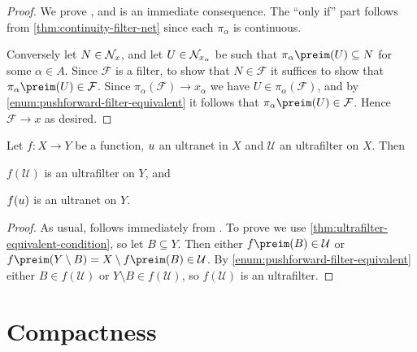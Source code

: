 \documentclass[article, a4paper, 11pt, oneside]{memoir}
\numberwithin{equation}{chapter}
\newcommand{\calU}{\mathcal{U}}
\newcommand{\calF}{\mathcal{F}}
\theoremstyle{nonumberplain}
\begin{document}
\begin{proof}
    We prove , and  is an immediate consequence. The \enquote{only if} part follows from \cref{thm:continuity-filter-net} since each $\pi_\alpha$ is continuous.
    
    Conversely let $N \in \mathcal{N}_{x}$, and let $U \in \mathcal{N}_{x_\alpha}$ be such that $\pi_\alpha\preim(U) \subseteq N$ for some $\alpha \in A$. Since $\calF$ is a filter, to show that $N \in \calF$ it suffices to show that $\pi_\alpha\preim(U) \in \calF$. Since $\pi_\alpha(\calF) \to x_\alpha$ we have $U \in \pi_\alpha(\calF)$, and by \cref{enum:pushforward-filter-equivalent} it follows that $\pi_\alpha\preim(U) \in \calF$. Hence $\calF \to x$ as desired.
\end{proof}


\begin{proposition}
    \label{thm:ultrafilter-pushforward}
    Let $f \colon X \to Y$ be a function, $u$ an ultranet in $X$ and $\calU$ an ultrafilter on $X$. Then
    \begin{enumprop}
        \item \label{enum:ultrafilter-pushforward} $f(\calU)$ is an ultrafilter on $Y$, and
        \item \label{enum:ultranet-pushforward} $f(u)$ is an ultranet on $Y$.
    \end{enumprop}
\end{proposition}

\begin{proof}
    As usual,  follows immediately from . To prove  we use \cref{thm:ultrafilter-equivalent-condition}, so let $B \subseteq Y$. Then either $f\preim(B) \in \calU$ or $f\preim(Y \setminus B) = X \setminus f\preim(B) \in \calU$. By \cref{enum:pushforward-filter-equivalent} either $B \in f(\calU)$ or $Y \setminus B \in f(\calU)$, so $f(\calU)$ is an ultrafilter.
\end{proof}


\chapter{Compactness}

\newcommand{\calK}{\mathcal{K}}
\end{document}
